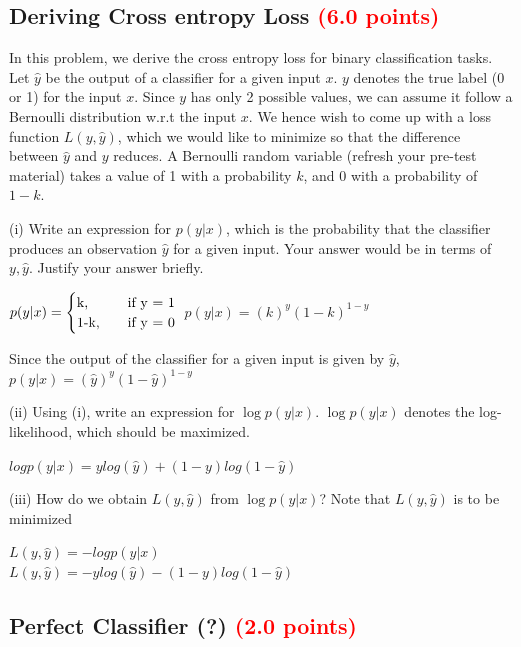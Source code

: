 \documentclass[answers]{exam}
\newcommand{\mypoints}[1]{\textcolor{red}{(#1 points)}}
\begin{document}
\subsection{Deriving Cross entropy Loss \mypoints{6.0}}
In this problem, we derive the cross entropy loss for binary classification tasks. Let $\hat{y}$ be the output of a classifier for a given input $x$. $y$ denotes the true label (0 or 1) for the input $x$. Since $y$ has only 2 possible values, we can assume it follow a Bernoulli distribution w.r.t the input $x$. We hence wish to come up with a loss function $L(y, \hat{y})$, which we would like to minimize so that the difference between $\hat{y}$ and $y$ reduces. A Bernoulli random variable (refresh your pre-test material) takes a value of 1 with a probability $k$, and 0 with a probability of $1-k$.  

(i) Write an expression for $p(y|x)$, which is the probability that the classifier produces an observation $\hat{y}$ for a given input. Your answer would be in terms of $y, \hat{y}$. Justify your answer briefly. 
\begin{solution}
$p(y|x) = 
     \begin{cases}
       \text{k,} &\quad\text{if y = 1}\\
       \text{1-k,} &\quad\text{if y = 0} \\
     \end{cases}\\
     \\$
$p(y|x) = (k)^y(1-k)^{1-y}$

Since the output of the classifier for a given input is given by $\hat{y}$,\\
$p(y|x) = (\hat{y})^y(1-\hat{y})^{1-y}$
\end{solution}
(ii) Using (i), write an expression for $\log p(y|x)$. $\log p(y|x)$ denotes the log-likelihood, which should be maximized.
\begin{solution}
$log p(y|x) = y log(\hat{y}) + (1-y)log(1-\hat{y})$
\end{solution}
(iii) How do we obtain $L(y, \hat{y})$ from $\log p(y|x)$? Note that $L(y, \hat{y})$ is to be minimized 
\begin{solution}
$L(y, \hat{y}) = - log p(y|x)$\\
$L(y, \hat{y}) = - y log(\hat{y}) - (1-y)log(1-\hat{y})$
\end{solution}

\subsection{ Perfect Classifier (?) \mypoints{2.0}}
\end{document}
